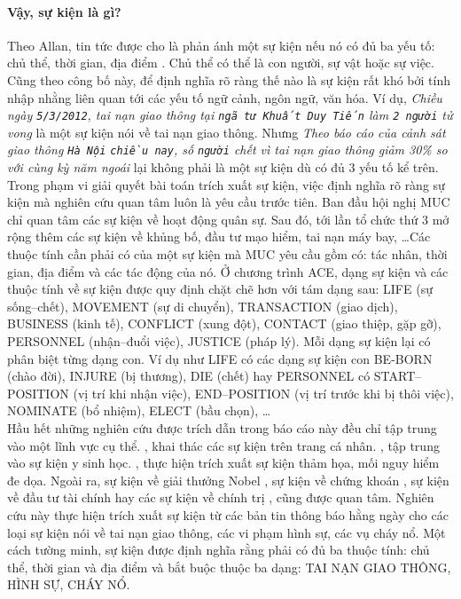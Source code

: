 \paragraph{Vậy, sự kiện là gì?} Theo Allan, tin tức được cho là phản ánh một sự kiện nếu nó có đủ ba yếu tố: chủ thể, thời gian, địa điểm \cite{JRV98}. Chủ thể có thể là con người, sự vật hoặc sự việc. Cũng theo công bố này, để định nghĩa rõ ràng thế nào là sự kiện rất khó bởi tính nhập nhằng liên quan tới các yếu tố ngữ cảnh, ngôn ngữ, văn hóa. Ví dụ, \emph{Chiều ngày \texttt{5/3/2012}, tai nạn giao thông tại \texttt{ngã tư Khuất Duy Tiến} làm \texttt{2 người} tử vong} là một sự kiện nói về tai nạn giao thông. Nhưng \emph{Theo báo cáo của cảnh sát giao thông \texttt{Hà Nội} \texttt{chiều nay}, số \texttt{người} chết vì tai nạn giao thông giảm 30\% so với cùng kỳ năm ngoái} lại không phải là một sự kiện dù có đủ 3 yếu tố kể trên. Trong phạm vi giải quyết bài toán trích xuất sự kiện, việc định nghĩa rõ ràng sự kiện mà nghiên cứu quan tâm luôn là yêu cầu trước tiên. Ban đầu  hội nghị MUC chỉ quan tâm các sự kiện về hoạt động quân sự. Sau đó, tới lần tổ chức thứ 3 mở rộng thêm các sự kiện về khủng bố, đầu tư mạo hiểm, tai nạn máy bay, \ldots Các thuộc tính cần phải có của một sự kiện mà MUC yêu cầu gồm có: tác nhân, thời gian, địa điểm và các tác động của nó. Ở chương trình ACE, dạng sự kiện và các thuộc tính về sự kiện được quy định chặt chẽ hơn với tám dạng sau: LIFE (sự sống--chết), MOVEMENT (sự di chuyển), TRANSACTION (giao dịch), BUSINESS (kinh tế), CONFLICT (xung đột), CONTACT (giao thiệp, gặp gỡ), PERSONNEL (nhận--đuổi việc), JUSTICE (pháp lý). Mỗi dạng sự kiện lại có phân biệt từng dạng con. Ví dụ như LIFE có các dạng  sự kiện  con BE-BORN (chào đời), INJURE (bị thương), DIE (chết) hay PERSONNEL có START--POSITION (vị trí khi nhận việc), END--POSITION (vị trí trước khi bị thôi việc), NOMINATE (bổ nhiệm), ELECT (bầu chọn), \ldots
\\
\noindent Hầu hết những nghiên cứu được trích dẫn trong báo cáo này đều chỉ tập trung vào một lĩnh vực cụ thể. \cite{MM09}, \cite{YKW09} khai thác các sự kiện trên trang cá nhân.  \cite{CVJ09}, \cite{CHR04} tập trung vào sự kiện y sinh học. \cite{HJM08}, \cite{JHP07} thực hiện trích xuất sự kiện thảm họa, mối nguy hiểm đe dọa. Ngoài ra, sự kiện về giải thưởng Nobel \cite{FHH06}, sự kiện về chứng khoán \cite{FHD02}, sự kiện về đầu tư tài chính \cite{CM00} hay các sự kiện về chính trị \cite{FK08}, \cite{CM00} cũng được quan tâm. Nghiên cứu này thực hiện trích xuất sự kiện từ các bản tin thông báo hằng ngày cho các loại sự kiện nói về tai nạn giao thông, các vi phạm hình sự, các vụ cháy nổ. Một cách tường minh,  sự kiện được định nghĩa  rằng phải có đủ ba thuộc tính: chủ thể, thời gian và địa điểm và bắt buộc thuộc ba dạng: TAI NẠN GIAO THÔNG, HÌNH SỰ, CHÁY NỔ.

